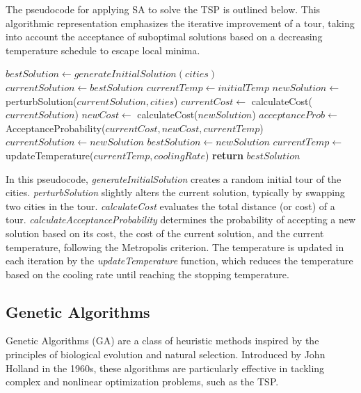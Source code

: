 The pseudocode for applying \Gls{SA} to solve the \Gls{TSP} is outlined below. This algorithmic representation emphasizes the iterative improvement of a tour, taking into account the acceptance of suboptimal solutions based on a decreasing temperature schedule to escape local minima.

\begin{algorithm}
	\caption{Simulated Annealing}\label{alg:detailedsimulatedannealing}
	\begin{algorithmic}[1]
		\State $bestSolution \gets generateInitialSolution(cities)$
		\State $currentSolution \gets bestSolution$
		\State $currentTemp \gets initialTemp$
		\State $newSolution \gets$ perturbSolution($currentSolution, cities$)
		\State $currentCost \gets$ calculateCost($currentSolution$)
		\State $newCost \gets$ calculateCost($newSolution$)
		\State $acceptanceProb \gets$ AcceptanceProbability($currentCost, newCost, currentTemp$)
		\State $currentSolution \gets newSolution$
		\State $bestSolution \gets newSolution$
		\EndIf
		\EndIf
		\State $currentTemp \gets$ updateTemperature($currentTemp, coolingRate$)
		\EndWhile
		\State \textbf{return} $bestSolution$
		\EndProcedure
	\end{algorithmic}
\end{algorithm}

In this pseudocode, \emph{generateInitialSolution} creates a random initial tour of the cities. \emph{perturbSolution} slightly alters the current solution, typically by swapping two cities in the tour. \emph{calculateCost} evaluates the total distance (or cost) of a tour. \emph{calculateAcceptanceProbability} determines the probability of accepting a new solution based on its cost, the cost of the current solution, and the current temperature, following the Metropolis criterion\cite{metropolis1953equation}. The temperature is updated in each iteration by the \emph{updateTemperature} function, which reduces the temperature based on the cooling rate until reaching the stopping temperature.

\subsection{Genetic Algorithms}

Genetic Algorithms (\Gls{GA}) are a class of heuristic methods inspired by the principles of biological evolution and natural selection. Introduced by John Holland in the 1960s, these algorithms are particularly effective in tackling complex and nonlinear optimization problems, such as the \Gls{TSP}.

